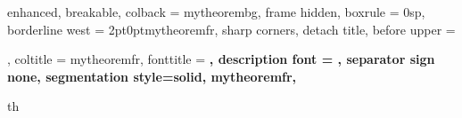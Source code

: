 \newenvironment{proof-sketch}{\noindent{\bf Sketch of Proof:}\hspace*{1em}}{\qed\bigskip\\}
\newenvironment{proof-idea}{\noindent{\bf Proof Idea:}\hspace*{1em}}{\qed\bigskip\\}
\newenvironment{proof-of-lemma}[1]{\noindent{\bf Proof of Lemma #1:}\hspace*{1em}}{\qed\bigskip\\}
\newenvironment{proof-of-claim}[1]{\noindent{\bf Proof of Claim #1:}\hspace*{1em}}{\qed\bigskip\\}
\newenvironment{proof-attempt}{\noindent{\bf Proof Attempt:}\hspace*{1em}}{\qed\bigskip\\}
\newenvironment{proofof}[1]{\noindent{\bf Proof:}
	of #1:\hspace*{1em}}{\qed\bigskip\\}
\newenvironment{remark}{\noindent{\bf Remark:}\hspace*{1em}}{\bigskip\\}
\newenvironment{answer}{%
	\setlength\parindent{0pt}\par\medskip\textbf{Answer:}\quad}{%
	\par\medskip}


\setlength{\parindent}{1cm}

{%
	enhanced,
	breakable,
	colback = mytheorembg,
	frame hidden,
	boxrule = 0sp,
	borderline west = {2pt}{0pt}{mytheoremfr},
	sharp corners,
	detach title,
	before upper = \tcbtitle\par\smallskip,
	coltitle = mytheoremfr,
	fonttitle = \bfseries\sffamily,
	description font = \mdseries,
	separator sign none,
	segmentation style={solid, mytheoremfr},
}
{th}
%


